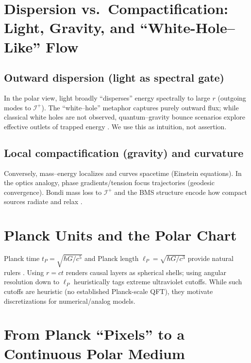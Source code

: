 \documentclass[12pt]{article}
\newcommand{\Iplus}{\mathcal{I}^+}
\begin{document}
\section{Dispersion vs.\ Compactification: Light, Gravity, and ``White-Hole--Like'' Flow}
\subsection{Outward dispersion (light as spectral gate)}
In the polar view, light broadly ``disperses'' energy spectrally to large $r$ (outgoing modes to $\Iplus$). The ``white–hole'' metaphor captures purely outward flux; while classical white holes are not observed, quantum–gravity bounce scenarios explore effective outlets of trapped energy \citep{deLorenzo2016}. We use this as intuition, not assertion.

\subsection{Local compactification (gravity) and curvature}
Conversely, mass–energy localizes and curves spacetime (Einstein equations). In the optics analogy, phase gradients/tension focus trajectories (geodesic convergence). Bondi mass loss to $\Iplus$ and the BMS structure encode how compact sources radiate and relax \citep{Bondi1962,Sachs1962,BMS}.

\section{Planck Units and the Polar Chart}
Planck time $t_P=\sqrt{\hbar G/c^5}$ and Planck length $\ell_P=\sqrt{\hbar G/c^3}$ provide natural rulers \citep{PlanckUnits}. Using $r=ct$ renders causal layers as spherical shells; using angular resolution down to $\ell_P$ heuristically tags extreme ultraviolet cutoffs. While such cutoffs are heuristic (no established Planck-scale QFT), they motivate discretizations for numerical/analog models.

\section{From Planck ``Pixels'' to a Continuous Polar Medium}
\label{sec:pixel-to-continuum}
\end{document}
